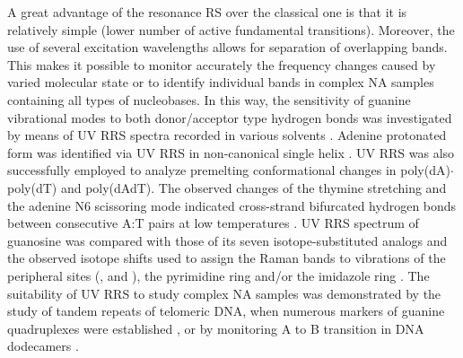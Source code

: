 A great advantage of the resonance RS over the classical one is that it is
relatively simple (lower number of active fundamental transitions).
Moreover, the use of several excitation wavelengths allows for separation of
overlapping bands.
This makes it possible to monitor accurately the frequency changes caused by
varied molecular state or to identify individual bands in complex NA samples
containing all types of nucleobases.
In this way, the sensitivity of guanine vibrational modes to both
donor/acceptor type hydrogen bonds was investigated by means of UV RRS spectra
recorded in various solvents
\parencite{Toyama1996}.
Adenine protonated form was identified via UV RRS in non-canonical 
single helix
\parencite{Mukerji1995}.
UV RRS was also successfully employed to analyze premelting conformational
changes in poly(dA)$\cdot$poly(dT) and poly(dAdT).
The observed changes of the thymine  stretching and the
adenine N6 scissoring mode indicated cross-strand bifurcated hydrogen bonds
between consecutive A:T pairs at low temperatures
\parencite{Chan1997}.
UV RRS spectrum of guanosine was compared with those of its seven
isotope-substituted analogs and the observed isotope shifts used to assign the
Raman bands to vibrations of the peripheral sites
	(,
	and ),
the pyrimidine ring and/or the imidazole ring
\parencite{Toyama1999}.
The suitability of UV RRS to study complex NA samples was demonstrated by the
study of tandem repeats of telomeric DNA, when numerous markers of guanine
quadruplexes were established
\parencite{Krafft2002},
or by monitoring A to B transition in DNA dodecamers
\parencite{Knee2008}.
